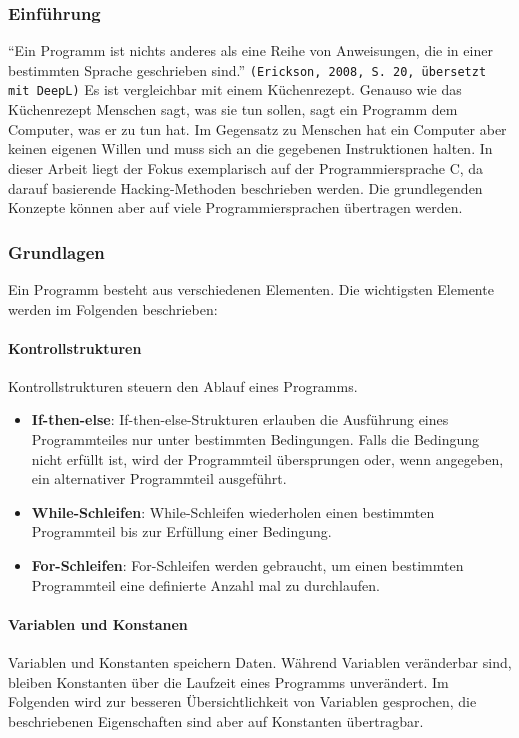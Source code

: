 \documentclass[11pt, a4paper]{article}
\begin{document}
\subsubsection{Einführung}
``Ein Programm ist nichts anderes als eine Reihe von Anweisungen, die in einer bestimmten Sprache geschrieben sind.'' \texttt{(Erickson, 2008, S. 20, übersetzt mit DeepL)} \cite{erickson2008hacking} Es ist vergleichbar mit einem Küchenrezept. Genauso wie das Küchenrezept Menschen sagt, was sie tun sollen, sagt ein Programm dem Computer, was er zu tun hat. Im Gegensatz zu Menschen hat ein Computer aber keinen eigenen Willen und muss sich an die gegebenen Instruktionen halten. In dieser Arbeit liegt der Fokus exemplarisch auf der Programmiersprache C, da darauf basierende Hacking-Methoden beschrieben werden. Die grundlegenden Konzepte können aber auf viele Programmiersprachen übertragen werden.
\subsubsection{Grundlagen}
Ein Programm besteht aus verschiedenen Elementen. Die wichtigsten Elemente werden im Folgenden beschrieben:

\paragraph{Kontrollstrukturen}
Kontrollstrukturen steuern den Ablauf eines Programms.
\begin{itemize}
	\item \textbf{If-then-else}: If-then-else-Strukturen erlauben die Ausführung eines Programmteiles nur unter bestimmten Bedingungen. Falls die Bedingung nicht erfüllt ist, wird der Programmteil übersprungen oder, wenn angegeben, ein alternativer Programmteil ausgeführt.
	\item \textbf{While-Schleifen}: While-Schleifen wiederholen einen bestimmten Programmteil bis zur Erfüllung einer Bedingung.
	\item \textbf{For-Schleifen}: For-Schleifen werden gebraucht, um einen bestimmten Programmteil eine definierte Anzahl mal zu durchlaufen.
\end{itemize}

\paragraph{Variablen und Konstanen}
Variablen und Konstanten speichern Daten. Während Variablen veränderbar sind, bleiben Konstanten über die Laufzeit eines Programms unverändert. Im Folgenden wird zur besseren Übersichtlichkeit von Variablen gesprochen, die beschriebenen Eigenschaften sind aber auf Konstanten übertragbar.
\end{document}
